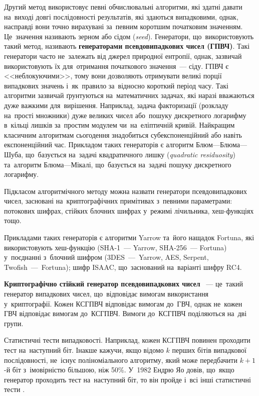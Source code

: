 \documentclass[a4paper,oneside,titlepage,14pt]{extarticle}
\begin{document}
			Другий метод використовує певні обчислювальні алгоритми, які здатні давати на~виході довгі послідовності результатів, які здаються випадковими, однак, насправді вони точно вирахувані за~певним коротшим початковим значенням. Це~значення називають зерном або сідом (\emph{seed}). Генератори, що~використовують такий метод, називають \textbf{генераторами псевдовипадкових чисел (ГПВЧ)}. Такі генератори часто не~залежать від джерел природної ентропії, однак, зазвичай використовують їх для~отримання початкового значення~--- сіду. ГПВЧ є <<неблокуючими>>, тому вони дозволяють отримувати великі порції випадкових значень і~як~правило за~відносно короткий період часу. Такі алгоритми зазвичай ґрунтуються на~математичних задачах, які наразі вважаються дуже важкими для~вирішення. Наприклад, задача факторизації (розкладу на~прості множники) дуже великих чисел або~пошуку дискретного логарифму в~кільці лишків за~простим модулем чи~на~еліптичній кривій. Найкращим класичним алгоритмам сьогодення знадобиться субекспоненційний або навіть експоненційний час. Прикладом таких генераторів є алгоритм Блюм---Блюма---Шуба, що~базується на~задачі квадратичного лишку (\emph{quadratic residuosity}) та~алгоритм Блюма---Мі\-ка\-лі, що~базується на~задачі пошуку дискретного логарифму.\par
			Підкласом алгоритмічного методу можна назвати генератори псевдовипадкових чисел, засновані на~криптографічних примітивах з~певними параметрами: потокових шифрах, стійких блочних шифрах у~режимі лічильника, хеш-функціях тощо.\par
			Прикладами таких генераторів є алгоритми Yarrow та~його нащадок Fortuna, які використовують хеш-функцію (SHA-1~--- Yarrow, SHA-256~--- Fortuna) у~поєднанні з~блочний шифром (3DES~--- Yarrow, AES, Serpent, Twofish~--- Fortuna); шифр ISAAC, що~заснований на~варіанті шифру RC4.\par
			\textbf{Криптографічно стійкий генератор псевдовипадкових чисел }~--- це~такий генератор випадкових чисел, що~відповідає вимогам \cite{appliedcrypto} використання у~криптографії. Кожен КСГПВЧ відповідає вимогам до~ГВЧ, однак не~кожен ГВЧ відповідає вимогам до~КСГПВЧ. Вимоги до~КСГПВЧ поділяються на~дві групи.\par
			Статистичні тести випадковості. Наприклад, кожен КСГПВЧ повинен проходити тест на~наступний біт. Інакше кажучи, якщо відомо $k$ перших бітів випадкової послідовності, не~існує поліноміального алгоритму, який може передбачити $k+1$-й біт з~імовірністю більшою, ніж 50\%. У~1982 Ендрю Яо довів, що~якщо генератор проходить тест на~наступний біт, то він пройде і~всі інші статистичні тести \cite{yao82}.\par
\end{document}
